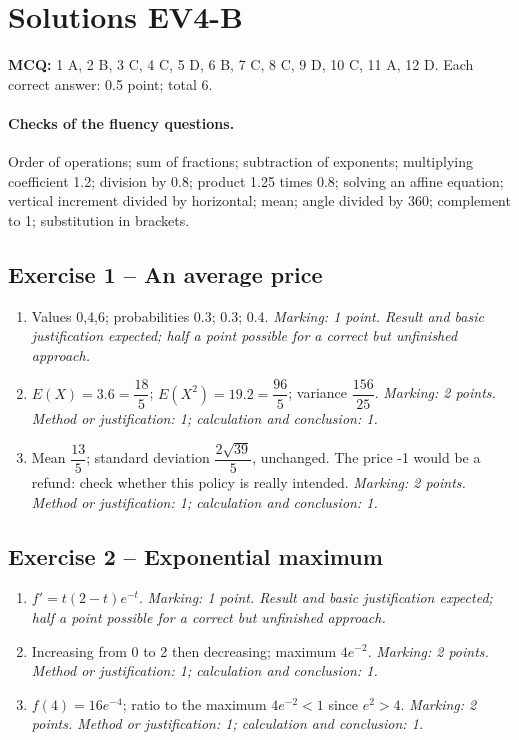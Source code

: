 \mxnewpage\section*{Solutions EV4-B}\label{EV4-B-CORR}
\textbf{MCQ:} 1 A, 2 B, 3 C, 4 C, 5 D, 6 B, 7 C, 8 C, 9 D, 10 C, 11 A, 12 D. Each correct answer: 0.5 point; total 6.
\paragraph{Checks of the fluency questions.} Order of operations; sum of fractions; subtraction of exponents; multiplying coefficient 1.2; division by 0.8; product 1.25 times 0.8; solving an affine equation; vertical increment divided by horizontal; mean; angle divided by 360; complement to 1; substitution in brackets.
\subsection*{Exercise 1 -- An average price}
\begin{enumerate}
\item Values 0{,}4,6; probabilities 0.3; 0.3; 0.4. \textit{Marking: 1 point. Result and basic justification expected; half a point possible for a correct but unfinished approach.}
\item $E(X)=3.6=\dfrac{18}{5}$; $E(X^2)=19.2=\dfrac{96}{5}$; variance $\dfrac{156}{25}$. \textit{Marking: 2 points. Method or justification: 1; calculation and conclusion: 1.}
\item Mean $\dfrac{13}{5}$; standard deviation $\dfrac{2\sqrt {39}}{5}$, unchanged. The price -1 would be a refund: check whether this policy is really intended. \textit{Marking: 2 points. Method or justification: 1; calculation and conclusion: 1.}
\end{enumerate}
\subsection*{Exercise 2 -- Exponential maximum}
\begin{enumerate}
\item $f\prime=t(2-t)e^{-t}$. \textit{Marking: 1 point. Result and basic justification expected; half a point possible for a correct but unfinished approach.}
\item Increasing from 0 to 2 then decreasing; maximum $4e^{-2}$. \textit{Marking: 2 points. Method or justification: 1; calculation and conclusion: 1.}
\item $f(4)=16e^{-4}$; ratio to the maximum $4e^{-2}<1$ since $e^2>4$. \textit{Marking: 2 points. Method or justification: 1; calculation and conclusion: 1.}
\end{enumerate}
